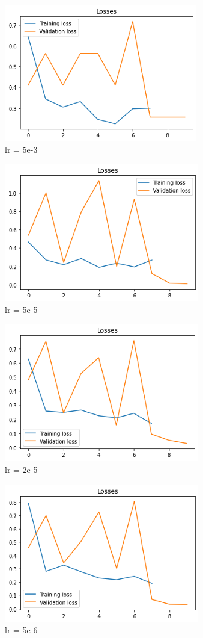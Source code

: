 \documentclass[11pt,a4paper]{article}
\begin{document}
\begin{figure}[!htbp]
	\centering
	\includegraphics{figures/figure6.png}
	\caption{\label{fig:my-label}  lr = 5e-3}
\end{figure}

\begin{figure}[!htbp]
	\centering
	\includegraphics{figures/figure7.png}
	\caption{\label{fig:my-label}  lr = 5e-5}
\end{figure}

\begin{figure}[!htbp]
	\centering
	\includegraphics{figures/figure8.png}
	\caption{\label{fig:my-label}  lr = 2e-5}
\end{figure}

\begin{figure}[!htbp]
	\centering
	\includegraphics{figures/figure9.png}
	\caption{\label{fig:my-label} lr = 5e-6}
\end{figure}
\end{document}
